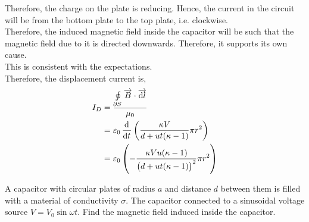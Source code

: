 \documentclass[fleqn, a4paper, 12pt, twoside]{article}
\theoremstyle{definition}
\theoremstyle{theorem}
\begin{document}
\begin{solution}
	Therefore, the charge on the plate is reducing.
	Hence, the current in the circuit will be from the bottom plate to the top plate, i.e. clockwise.\\
	Therefore, the induced magnetic field inside the capacitor will be such that the magnetic field due to it is directed downwards.
	Therefore, it supports its own cause.\\
	This is consistent with the expectations.\\
	Therefore, the displacement current is,
	\begin{align*}
		I_D & = \frac{\oint\limits_{\partial S} \overrightarrow{B} \cdot \overrightarrow{\dif l}}{\mu_0} \\
                    & = \varepsilon_0 \dod{}{t}\left( \frac{\kappa V}{d + u t (\kappa - 1)} \pi r^2 \right)      \\
                    & = \varepsilon_0 \left( -\frac{\kappa V u (\kappa - 1)}{\left( d + u t (\kappa - 1) \right)^2} \pi r^2 \right)
	\end{align*}
\end{solution}

\begin{question}
	A capacitor with circular plates of radius $a$ and distance $d$ between them is filled with a material of conductivity $\sigma$.
	The capacitor connected to a sinusoidal voltage source $V = V_0 \sin \omega t$.
	Find the magnetic field induced inside the capacitor.
	\begin{figure}[H]
	\end{figure}
\end{question}
\end{document}
